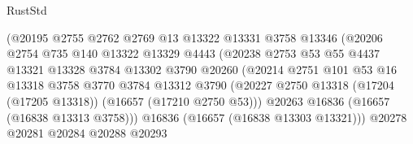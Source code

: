\begin{lexlean}{RustStd}
\begin{coremodule}
                                    (@20195
                                      @2755
                                      @2762
                                      @2769
                                      @13
                                      @13322
                                      @13331
                                      @3758
                                      @13346
                                      (@20206
                                        @2754
                                        @735
                                        @140
                                        @13322
                                        @13329
                                        @4443
                                        (@20238
                                          @2753
                                          @53
                                          @55
                                          @4437
                                          @13321
                                          @13328
                                          @3784
                                          @13302
                                          @3790
                                          @20260
                                          (@20214
                                            @2751
                                            @101
                                            @53
                                            @16
                                            @13318
                                            @3758
                                            @3770
                                            @3784
                                            @13312
                                            @3790
                                            (@20227
                                              @2750
                                              @13318
                                              (@17204 (@17205 @13318))
                                              (@16657 (@17210 @2750 @53)))
                                            @20263
                                            @16836
                                            (@16657 (@16838 @13313 @3758)))
                                          @16836
                                          (@16657 (@16838 @13303 @13321)))
                                        @20278
                                        @20281
                                        @20284
                                        @20288
                                        @20293

\end{coremodule}
\end{lexlean}
